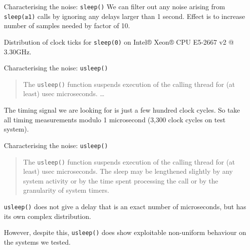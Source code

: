 \documentclass[presentation,smaller]{beamer}
\begin{document}
\begin{frame}[fragile,label={sec:orgheadline20}]{Characterising the noise: \texttt{sleep()}}
 We can filter out any noise arising from \texttt{sleep(≥1)} calls by ignoring any delays larger than 1 second. Effect is to increase number of samples needed by factor of 10.


\footnotesize Distribution of clock ticks for \texttt{sleep(0)} on Intel® Xeon® CPU E5-2667 v2 @ 3.30GHz.
\end{frame}

\begin{frame}[fragile,label={sec:orgheadline21}]{Characterising the noise: \texttt{usleep()}}
 \begin{quote}
The \texttt{usleep()} function suspends execution of the calling thread for (at least) usec microseconds. …
\end{quote}

The timing signal we are looking for is just a few hundred clock cycles. So take all timing measurements modulo 1 microsecond (3,300 clock cycles on test system).
\end{frame}

\begin{frame}[fragile,label={sec:orgheadline22}]{Characterising the noise: \texttt{usleep()}}
 \begin{quote}
The \texttt{usleep()} function suspends execution of the calling thread for (at least) usec microseconds. \alert{The sleep may be lengthened slightly by any system activity or by the time spent processing the call or by the granularity of system timers.}
\end{quote}

\texttt{usleep()} does not give a delay that is an exact number of microseconds, but has its own complex distribution.

\pause

However, despite this, \texttt{usleep()} does show exploitable non-uniform behaviour on the systems we tested.
\end{frame}
\end{document}

